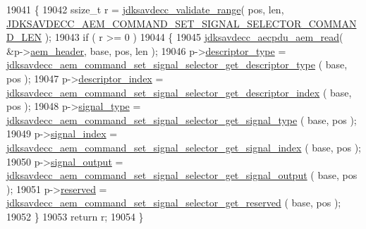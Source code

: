 \begin{DoxyCode}
19041 \{
19042     ssize\_t r = \hyperlink{group__util_ga9c02bdfe76c69163647c3196db7a73a1}{jdksavdecc\_validate\_range}( pos, len, 
      \hyperlink{group__command__set__signal__selector_ga83f59269adfc23a88c27c293398c953d}{JDKSAVDECC\_AEM\_COMMAND\_SET\_SIGNAL\_SELECTOR\_COMMAND\_LEN}
       );
19043     \textcolor{keywordflow}{if} ( r >= 0 )
19044     \{
19045         \hyperlink{group__aecpdu__aem_gae2421015dcdce745b4f03832e12b4fb6}{jdksavdecc\_aecpdu\_aem\_read}( &p->\hyperlink{structjdksavdecc__aem__command__set__signal__selector_ae1e77ccb75ff5021ad923221eab38294}{aem\_header}, base, pos, len );
19046         p->\hyperlink{structjdksavdecc__aem__command__set__signal__selector_ab7c32b6c7131c13d4ea3b7ee2f09b78d}{descriptor\_type} = 
      \hyperlink{group__command__set__signal__selector_gaee2e81eb3c23ba7973dec680bc8dba95}{jdksavdecc\_aem\_command\_set\_signal\_selector\_get\_descriptor\_type}
      ( base, pos );
19047         p->\hyperlink{structjdksavdecc__aem__command__set__signal__selector_a042bbc76d835b82d27c1932431ee38d4}{descriptor\_index} = 
      \hyperlink{group__command__set__signal__selector_ga8c762e3079314d1001b8193c41049501}{jdksavdecc\_aem\_command\_set\_signal\_selector\_get\_descriptor\_index}
      ( base, pos );
19048         p->\hyperlink{structjdksavdecc__aem__command__set__signal__selector_a248e60ef99d5ed1779989d1dd6b6dc5a}{signal\_type} = 
      \hyperlink{group__command__set__signal__selector_gad6a29b738378811722b84ffbaf332d28}{jdksavdecc\_aem\_command\_set\_signal\_selector\_get\_signal\_type}
      ( base, pos );
19049         p->\hyperlink{structjdksavdecc__aem__command__set__signal__selector_ae2e81a95ee9ad83f1fe22b6a1ee29075}{signal\_index} = 
      \hyperlink{group__command__set__signal__selector_gad129f712cf56b197817fc8db6afeeabe}{jdksavdecc\_aem\_command\_set\_signal\_selector\_get\_signal\_index}
      ( base, pos );
19050         p->\hyperlink{structjdksavdecc__aem__command__set__signal__selector_ab4b91864e6fc335d7e86536d9f4461e4}{signal\_output} = 
      \hyperlink{group__command__set__signal__selector_ga24e3ce61ff4f56c8feb2f7a31d378542}{jdksavdecc\_aem\_command\_set\_signal\_selector\_get\_signal\_output}
      ( base, pos );
19051         p->\hyperlink{structjdksavdecc__aem__command__set__signal__selector_a5a6ed8c04a3db86066924b1a1bf4dad3}{reserved} = 
      \hyperlink{group__command__set__signal__selector_ga929c9673fe046730d2f76fc821f8b18d}{jdksavdecc\_aem\_command\_set\_signal\_selector\_get\_reserved}
      ( base, pos );
19052     \}
19053     \textcolor{keywordflow}{return} r;
19054 \}
\end{DoxyCode}


